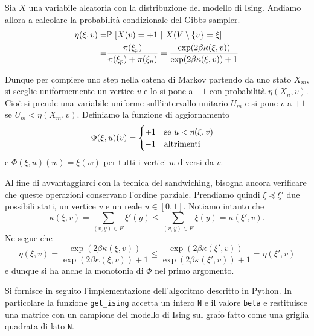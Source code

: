 \documentclass[]{marticle}
\begin{document}
Sia $X$ una variabile aleatoria con la distribuzione del modello di Ising.
Andiamo allora a calcolare la probabilit\`a condizionale del Gibbs sampler.
\begin{align*}
    \eta(\xi,v) =&
    \mathbb{P}\ [X(v)=+1\ |\ X(V\setminus \{v\}=\xi]\\
    =& \frac{\pi(\xi_p)}{\pi(\xi_p)+\pi(\xi_n)}
    = \frac{\exp(2\beta\kappa(\xi,v))}{\exp(2\beta\kappa(\xi,v))+1}
\end{align*}

Dunque per compiere uno step nella catena di Markov partendo da uno stato $X_m$,
si sceglie uniformemente un vertice $v$ e lo si pone a $+1$ con probabilit\`a
$\eta(X_n, v)$. Cio\`e si prende una variabile uniforme sull'intervallo unitario
$U_m$ e si pone $v$ a $+1$ se $U_m<\eta(X_m,v)$. Definiamo la funzione di
aggiornamento
\[
    \Phi(\xi, u)(v) = 
    \begin{cases}
        +1 \text{\quad se $u < \eta(\xi,v)$}\\
        -1 \text{\quad altrimenti}
    \end{cases}
\]
e $\Phi(\xi,u)(w) = \xi(w)$ per tutti i vertici $w$ diversi da $v$.

Al fine di avvantaggiarci con la tecnica del sandwiching, bisogna ancora
verificare che queste operazioni conservano l'ordine parziale. Prendiamo quindi
$\xi \preceq \xi'$ due possibili stati, un vertice $v$ e un reale $u\in[0,1]$.
Notiamo intanto che
\[
    \kappa(\xi,v) = \sum_{(v,y)\in E} \xi'(y) \leq
    \sum_{(v,y)\in E} \xi(y) = \kappa(\xi', v).
\]
Ne segue che 
\[
    \eta(\xi,v) = \frac{\exp(2\beta\kappa(\xi,v))}{\exp(2\beta\kappa(\xi,v))+1}
    \leq \frac{\exp(2\beta\kappa(\xi',v))}{\exp(2\beta\kappa(\xi',v))+1}
    = \eta(\xi',v)
\]
e dunque si ha anche la monotonia di $\Phi$ nel primo argomento.

Si fornisce in seguito l'implementazione dell'algoritmo descritto in Python. In
particolare la funzione \texttt{get\_ising} accetta un intero \texttt{N} e il
valore \texttt{beta} e restituisce una matrice con un campione del modello di
Ising sul grafo fatto come una griglia quadrata di lato \texttt{N}.
\end{document}
